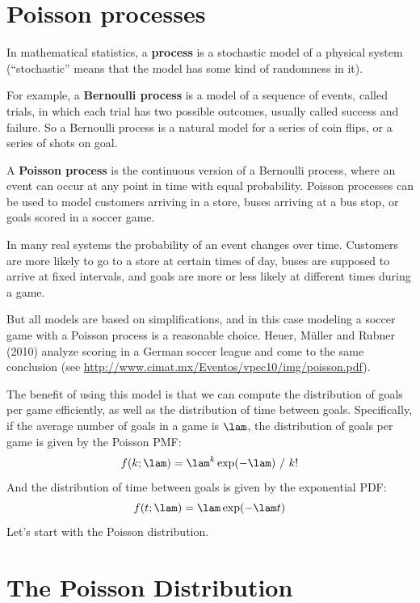 \documentclass[12pt]{book}
\theoremstyle{exercise}
\begin{document}
\section{Poisson processes}

In mathematical statistics, a {\bf process} is a stochastic model of a
physical system (``stochastic'' means that the model has some kind of
randomness in it).  

For example, a {\bf Bernoulli process} is a model of a
sequence of events, called trials, in which each trial has two
possible outcomes, usually called success and failure.  
So a Bernoulli process
is a natural model for a series of coin flips, or a series of shots on
goal.  

A {\bf Poisson process} is the continuous version of a Bernoulli process,
where an event can occur at any point in time with equal probability.
Poisson processes can be used to model customers arriving in a store,
buses arriving at a bus stop, or goals scored in a soccer game.

In many real systems the probability of an event changes over time.
Customers are more likely to go to a store at certain times of day,
buses are supposed to arrive at fixed intervals, and goals are more
or less likely at different times during a game.

But all models are based on simplifications, and in this case modeling
a soccer game with a Poisson process is a reasonable choice.  Heuer,
M\"{u}ller and Rubner (2010) analyze scoring in a German soccer league
and come to the same conclusion (see
\url{http://www.cimat.mx/Eventos/vpec10/img/poisson.pdf}).

The benefit of using this model is that we can compute the distribution
of goals per game efficiently, as well as the distribution of time
between goals.  Specifically, if the average number of goals
in a game is $\lam$, the distribution of goals per game is
given by the Poisson PMF:
%
\[ f(k; \lam) = \lam^k \exp(-\lam) ~/~ k! \]
%
And the distribution of time between goals is given by the
exponential PDF:
%
\[ f(t; \lam) = \lam \exp(-\lam t) \]
%
Let's start with the Poisson distribution.


\section{The Poisson Distribution}
\end{document}
